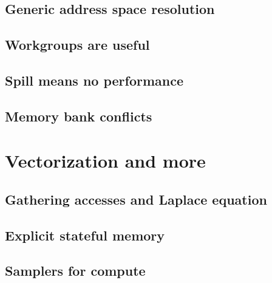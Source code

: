 \documentclass[a4paper,12pt,oneside]{article}
\begin{document}
\subsection{Generic address space resolution}\label{subsec:GenAddr}


\subsection{Workgroups are useful}\label{subsec:Wgroups}


\subsection{Spill means no performance}\label{subsec:Spills}


\subsection{Memory bank conflicts}\label{subsec:Banks}


\section{Vectorization and more}\label{sec:Vectors}


\subsection{Gathering accesses and Laplace equation}\label{subsec:Laplace}


\subsection{Explicit stateful memory}\label{subsec:Stateful}


\subsection{Samplers for compute}\label{subsec:Samplers}

\end{document}
